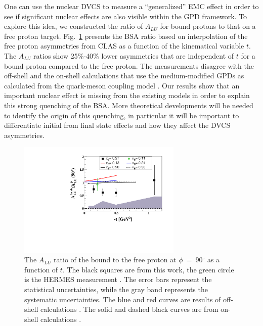 \documentclass[twocolumn,nofootinbib,prl,superscriptaddress,secnumarabic,amssymb,nobibnotes,aps,floatfix]{revtex4}
\begin{document}
One can use the nuclear DVCS to measure a ``generalized'' EMC effect in order 
to see if significant nuclear effects are also visible within the GPD 
framework. To explore this idea, we constructed the ratio of $A_{LU}$ for bound 
protons to that on a free proton target.  
Fig.~\ref{fig:incoh_EMC_ratio_ALU_proton} presents the BSA ratio based on 
interpolation of the free proton asymmetries from CLAS \cite{Girod:2007aa} as a 
function of the kinematical variable $t$. The $A_{LU}$ ratios show 25\%-40\% 
lower asymmetries that are independent of $t$ for a bound proton compared to 
the free proton. The measurements disagree with the off-shell 
\cite{simonetta_2} and the on-shell calculations that use the medium-modified 
GPDs as calculated from the quark-meson coupling model \cite{Guzey:2008fe}. Our 
results show that an important nuclear effect is missing from the existing 
models in order to explain this strong quenching of the BSA. More theoretical 
developments will be needed to identify the origin of this quenching, in 
particular it will be important to differentiate initial from final state 
effects and how they affect the DVCS asymmetries.

\begin{figure}[tb]
\centering
\includegraphics[width=7.8cm]{figs/ALU_ratioInc_t_shortscenrario-without-error-onX.pdf}
\caption{ The $A_{LU}$ ratio of the bound to the free proton at 
   $\phi$~=~90$^{\circ}$ as a function of $t$. The black squares are from this 
   work, the green circle is the HERMES measurement \cite{Airapetian:2009cga}.  
   The error bars represent the statistical uncertainties, while the gray band 
   represents the systematic uncertainties. The blue and red curves are results 
   of off-shell calculations \cite{simonetta_2}. The solid and dashed black 
   curves are from on-shell calculations \cite{Guzey:2008fe}.} 
   \label{fig:incoh_EMC_ratio_ALU_proton}
\end{figure}
\end{document}
